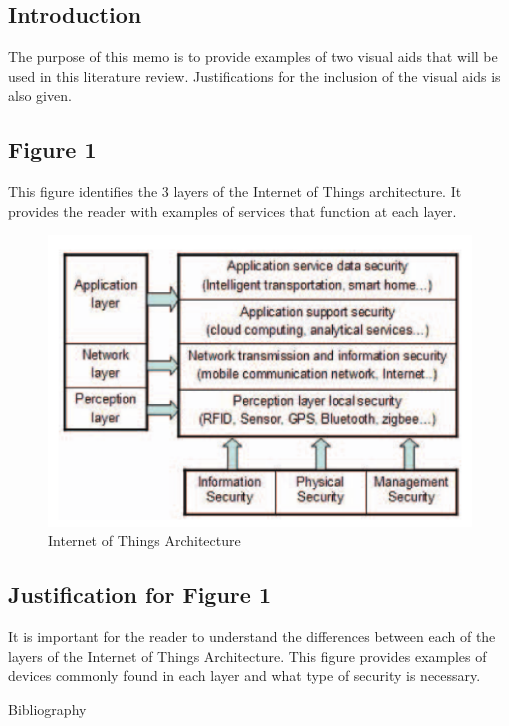 \documentclass[letterpaper, 12pt]{texMemo}
\begin{document}
\maketitle
\begin{flushleft}
\subsection*{Introduction}
The purpose of this memo is to provide examples of two visual aids that will be used in this literature review. Justifications for the inclusion of the visual aids is also given.

\subsection*{Figure 1}
This figure identifies the 3 layers of the Internet of Things architecture. It provides the reader with examples of services that function at each layer.


\begin{figure}[h!]
	\includegraphics[width=\linewidth]{figure2.png}
	\caption{Internet of Things Architecture}
	\label{fig:arch}
\end{figure}

\subsection*{Justification for Figure 1}
It is important for the reader to understand the differences between each of the layers of the Internet of Things Architecture. 
This figure provides examples of devices commonly found in each layer and what type of security is necessary. 

\newpage
Bibliography\\
~\newline
\end{flushleft}
\end{document}
